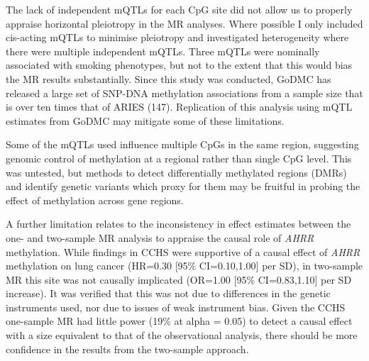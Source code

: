 \documentclass[11pt,oneside]{bristolthesis}
\begin{document}
The lack of independent mQTLs for each CpG site did not allow us to properly appraise horizontal pleiotropy in the MR analyses. Where possible I only included cis-acting mQTLs to minimise pleiotropy and investigated heterogeneity where there were multiple independent mQTLs. Three mQTLs were nominally associated with smoking phenotypes, but not to the extent that this would bias the MR results substantially. Since this study was conducted, GoDMC has released a large set of SNP-DNA methylation associations from a sample size that is over ten times that of ARIES (147). Replication of this analysis using mQTL estimates from GoDMC may mitigate some of these limitations.

Some of the mQTLs used influence multiple CpGs in the same region, suggesting genomic control of methylation at a regional rather than single CpG level. This was untested, but methods to detect differentially methylated regions (DMRs) and identify genetic variants which proxy for them may be fruitful in probing the effect of methylation across gene regions.

A further limitation relates to the inconsistency in effect estimates between the one- and two-sample MR analysis to appraise the causal role of \emph{AHRR} methylation. While findings in CCHS were supportive of a causal effect of \emph{AHRR} methylation on lung cancer (HR=0.30 {[}95\% CI=0.10,1.00{]} per SD), in two-sample MR this site was not causally implicated (OR=1.00 {[}95\% CI=0.83,1.10{]} per SD increase). It was verified that this was not due to differences in the genetic instruments used, nor due to issues of weak instrument bias. Given the CCHS one-sample MR had little power (19\% at alpha = 0.05) to detect a causal effect with a size equivalent to that of the observational analysis, there should be more confidence in the results from the two-sample approach.
\end{document}

